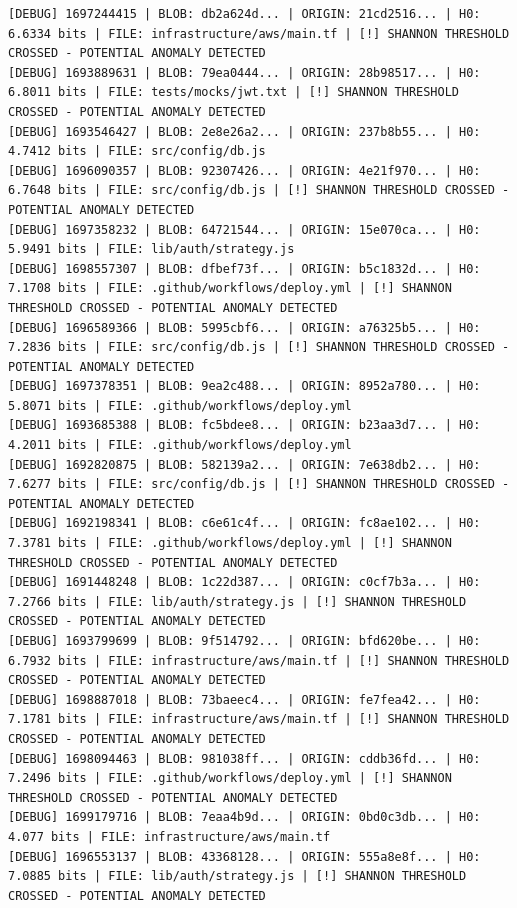 \documentclass[12pt, a4paper, oneside]{report}
\begin{document}
\begin{lstlisting}[basicstyle=\tiny\ttfamily]
[DEBUG] 1697244415 | BLOB: db2a624d... | ORIGIN: 21cd2516... | H0: 6.6334 bits | FILE: infrastructure/aws/main.tf | [!] SHANNON THRESHOLD CROSSED - POTENTIAL ANOMALY DETECTED
[DEBUG] 1693889631 | BLOB: 79ea0444... | ORIGIN: 28b98517... | H0: 6.8011 bits | FILE: tests/mocks/jwt.txt | [!] SHANNON THRESHOLD CROSSED - POTENTIAL ANOMALY DETECTED
[DEBUG] 1693546427 | BLOB: 2e8e26a2... | ORIGIN: 237b8b55... | H0: 4.7412 bits | FILE: src/config/db.js
[DEBUG] 1696090357 | BLOB: 92307426... | ORIGIN: 4e21f970... | H0: 6.7648 bits | FILE: src/config/db.js | [!] SHANNON THRESHOLD CROSSED - POTENTIAL ANOMALY DETECTED
[DEBUG] 1697358232 | BLOB: 64721544... | ORIGIN: 15e070ca... | H0: 5.9491 bits | FILE: lib/auth/strategy.js
[DEBUG] 1698557307 | BLOB: dfbef73f... | ORIGIN: b5c1832d... | H0: 7.1708 bits | FILE: .github/workflows/deploy.yml | [!] SHANNON THRESHOLD CROSSED - POTENTIAL ANOMALY DETECTED
[DEBUG] 1696589366 | BLOB: 5995cbf6... | ORIGIN: a76325b5... | H0: 7.2836 bits | FILE: src/config/db.js | [!] SHANNON THRESHOLD CROSSED - POTENTIAL ANOMALY DETECTED
[DEBUG] 1697378351 | BLOB: 9ea2c488... | ORIGIN: 8952a780... | H0: 5.8071 bits | FILE: .github/workflows/deploy.yml
[DEBUG] 1693685388 | BLOB: fc5bdee8... | ORIGIN: b23aa3d7... | H0: 4.2011 bits | FILE: .github/workflows/deploy.yml
[DEBUG] 1692820875 | BLOB: 582139a2... | ORIGIN: 7e638db2... | H0: 7.6277 bits | FILE: src/config/db.js | [!] SHANNON THRESHOLD CROSSED - POTENTIAL ANOMALY DETECTED
[DEBUG] 1692198341 | BLOB: c6e61c4f... | ORIGIN: fc8ae102... | H0: 7.3781 bits | FILE: .github/workflows/deploy.yml | [!] SHANNON THRESHOLD CROSSED - POTENTIAL ANOMALY DETECTED
[DEBUG] 1691448248 | BLOB: 1c22d387... | ORIGIN: c0cf7b3a... | H0: 7.2766 bits | FILE: lib/auth/strategy.js | [!] SHANNON THRESHOLD CROSSED - POTENTIAL ANOMALY DETECTED
[DEBUG] 1693799699 | BLOB: 9f514792... | ORIGIN: bfd620be... | H0: 6.7932 bits | FILE: infrastructure/aws/main.tf | [!] SHANNON THRESHOLD CROSSED - POTENTIAL ANOMALY DETECTED
[DEBUG] 1698887018 | BLOB: 73baeec4... | ORIGIN: fe7fea42... | H0: 7.1781 bits | FILE: infrastructure/aws/main.tf | [!] SHANNON THRESHOLD CROSSED - POTENTIAL ANOMALY DETECTED
[DEBUG] 1698094463 | BLOB: 981038ff... | ORIGIN: cddb36fd... | H0: 7.2496 bits | FILE: .github/workflows/deploy.yml | [!] SHANNON THRESHOLD CROSSED - POTENTIAL ANOMALY DETECTED
[DEBUG] 1699179716 | BLOB: 7eaa4b9d... | ORIGIN: 0bd0c3db... | H0: 4.077 bits | FILE: infrastructure/aws/main.tf
[DEBUG] 1696553137 | BLOB: 43368128... | ORIGIN: 555a8e8f... | H0: 7.0885 bits | FILE: lib/auth/strategy.js | [!] SHANNON THRESHOLD CROSSED - POTENTIAL ANOMALY DETECTED

\end{lstlisting}
\end{document}
